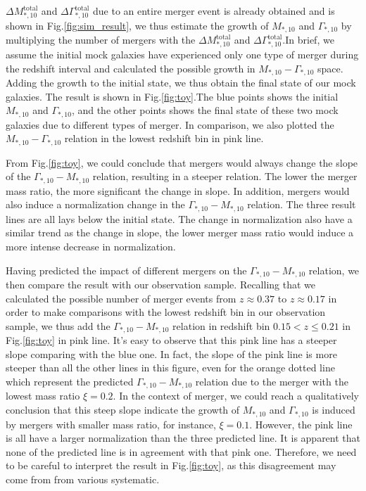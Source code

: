 \documentclass[fleqn,usenatbib]{mnras}
\begin{document}
 $\Delta M_{*,10}^{\text{total}}$ and $\Delta \Gamma_{*,10}^{\text{total}}$ due to an entire merger event is already obtained and is shown in Fig.\ref{fig:sim_result}, we thus estimate the growth of $M_{*,10}$ and $\Gamma_{*,10}$ by multiplying the number of mergers with the $\Delta M_{*,10}^{\text{total}}$ and $\Delta \Gamma_{*,10}^{\text{total}}$.In brief, we assume the initial mock galaxies have experienced only one type of merger during the redshift interval and calculated the possible growth in $M_{*,10}-\Gamma_{*,10}$ space. Adding the growth to the initial state, we thus obtain the final state of our mock galaxies. 
The result is shown in Fig.\ref{fig:toy}.The blue points shows the initial $M_{*,10}$ and $\Gamma_{*,10}$, and the other points shows the final state of these two mock galaxies due to different types of merger. In comparison, we also plotted the $M_{*,10} - \Gamma_{*,10}$ relation in the lowest redshift bin in pink line. 
\par From Fig.\ref{fig:toy}, we could conclude that mergers would always change the slope of the $\Gamma_{*,10} - M_{*,10}$ relation, resulting in a steeper relation. The lower the merger mass ratio, the more significant the change in slope. In addition, mergers would also induce a normalization change in the $\Gamma_{*,10} - M_{*,10}$ relation. The three result lines are all lays below the initial state. The change in normalization also have a similar trend as the change in slope, the lower merger mass ratio would induce a more intense decrease in normalization. 
\par Having predicted the impact of different mergers on the $\Gamma_{*,10} - M_{*,10}$ relation, we then compare the result with our observation sample. Recalling that we calculated the possible number of merger events from $z \approx 0.37$ to $z \approx 0.17$ in order to make comparisons with the lowest redshift bin in our observation sample, we thus add the $\Gamma_{*,10} -M_{*,10}$ relation in redshift bin $0.15 < z \leq 0.21$ in Fig.\ref{fig:toy} in pink line. It's easy to observe that this pink line has a steeper slope comparing with the blue one. In fact, the slope of the pink line is more steeper than all the other lines in this figure, even for the orange dotted line which represent the predicted $\Gamma_{*,10} - M_{*,10}$ relation due to the merger with the lowest mass ratio $\xi = 0.2$. In the context of merger, we could reach a qualitatively conclusion that this steep slope indicate the growth of $M_{*,10}$ and $\Gamma_{*,10}$ is induced by mergers with smaller mass ratio, for instance, $\xi = 0.1$. However, the pink line is all have a larger normalization than the three predicted line. It is apparent that none of the predicted line is in agreement with that pink one. Therefore, we need to be careful to interpret the result in Fig.\ref{fig:toy}, as this disagreement may come from from various systematic.
\end{document}
